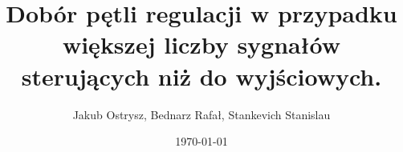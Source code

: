 \documentclass{beamer}
\title{Dobór pętli regulacji w przypadku większej liczby sygnałów sterujących niż do wyjściowych.}
\author{Jakub Ostrysz, Bednarz Rafał, Stankevich Stanislau}
\date{\today}
\begin{document}
\begin{frame}
    \titlepage 
\end{frame}







\end{document}
